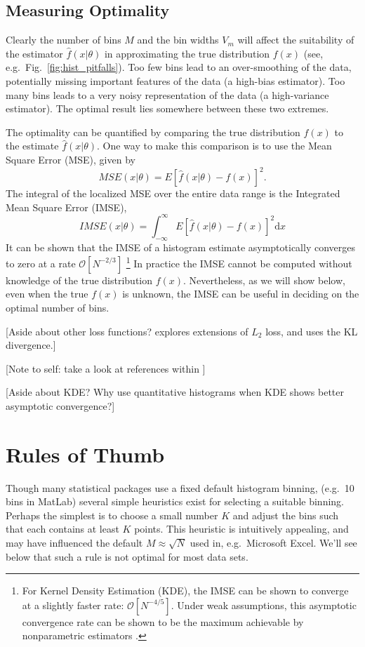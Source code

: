 \documentclass[12pt]{article}
\newcommand{\comment}[1]{{\color{blue} [#1]}}
\newcommand{\dd}{\mathrm{d}}
\newcommand{\fig}[1]{Fig.~\ref{fig:#1}}
\begin{document}
\subsection{Measuring Optimality}
Clearly the number of bins $M$ and the bin widths $V_m$ will affect the
suitability of the estimator $\hat{f}(x|\theta)$ in approximating the true
distribution $f(x)$ (see, e.g.\ \fig{hist_pitfalls}).
Too few bins lead to an over-smoothing of the data,
potentially missing important features of the data (a high-bias estimator).
Too many bins leads to a very noisy representation of the data
(a high-variance estimator).  The optimal result lies somewhere between
these two extremes.

The optimality can be quantified by comparing the true distribution $f(x)$ to
the estimate $\hat{f}(x|\theta)$.  One way to make this comparison is to use
the Mean Square Error (MSE), given by
\begin{equation}
  MSE(x|\theta) = E[\hat{f}(x|\theta) - f(x)]^2.
\end{equation}
The integral of the localized MSE over the entire data range is the
Integrated Mean Square Error (IMSE),
\begin{equation}
  \label{eq:IMSE}
  IMSE(x|\theta) = \int_{-\infty}^\infty E[\hat{f}(x|\theta) - f(x)]^2 \dd x 
\end{equation}
It can be shown that the IMSE of a histogram estimate
asymptotically converges to zero at a rate $\mathcal{O}[N^{-2/3}]$
\citep{Scott1979}\footnote{For Kernel Density Estimation (KDE),
  the IMSE can be shown to converge at
  a slightly faster rate: $\mathcal{O}[N^{-4/5}]$. Under weak assumptions,
  this asymptotic convergence rate can be shown to be the maximum achievable
  by nonparametric estimators \citep{Wahba1975}.}
In practice the IMSE cannot be computed without knowledge of the true
distribution $f(x)$.  Nevertheless, as we will show below, even when the
true $f(x)$ is unknown, the IMSE can be useful in deciding on the optimal
number of bins.

\comment{Aside about other loss functions?  \citet{Birge2003} explores
  extensions of $L_2$ loss, and \citet{Rudemo1982} uses the KL divergence.}

\comment{Note to self: take a look at references within \citet{Birge2003}}

\comment{Aside about KDE?  Why use quantitative histograms when KDE shows
  better asymptotic convergence?}


\section{Rules of Thumb}
\label{sec:rules_of_thumb}
Though many statistical packages use a fixed default histogram binning,
(e.g.\ 10 bins in MatLab) several simple heuristics
exist for selecting a suitable binning.  Perhaps the simplest is to choose
a small number $K$ and adjust the bins such that each contains at least $K$
points.  This heuristic is intuitively appealing, and may have
influenced the default $M \approx \sqrt{N}$ used in, e.g.\ Microsoft Excel.
We'll see below that such a rule is not optimal for most data sets.
\end{document}
